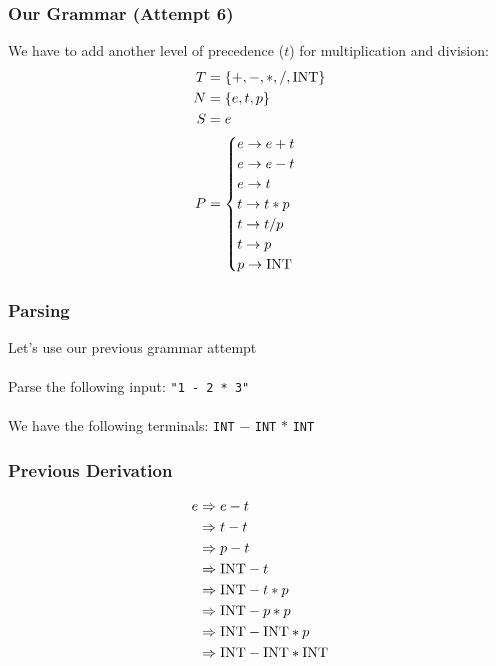 \documentclass[aspectratio=169]{beamer}
\begin{document}
\begin{frame}
\frametitle{Our Grammar (Attempt 6)}

We have to add another level of precedence ($t$) for multiplication and division:
\begin{align*}
T &= \{ +, -, *, /, \text{\lstinline{INT}} \}\\
N &= \{ e, t, p \}\\
S &= e\\
P &= \begin{cases}e \rightarrow e + t\\
     e \rightarrow e - t\\
     e \rightarrow t\\
     t \rightarrow t * p\\
     t \rightarrow t / p\\
     t \rightarrow p\\
     p \rightarrow \text{\lstinline{INT}}\end{cases}
\end{align*}
\end{frame}

\begin{frame}
\frametitle{Parsing}

Let's use our previous grammar attempt\\~\\

Parse the following input: \lstinline{"1 - 2 * 3"}\\~\\

We have the following terminals: \lstinline{INT} $-$ \lstinline{INT} $*$
\lstinline{INT}
\end{frame}

\begin{frame}
\frametitle{Previous Derivation}

\begin{align*}
e &\Rightarrow e - t\\
  &\Rightarrow t - t\\
  &\Rightarrow p - t\\
  &\Rightarrow \text{\lstinline{INT}} - t\\
  &\Rightarrow \text{\lstinline{INT}} - t * p\\
  &\Rightarrow \text{\lstinline{INT}} - p * p\\
  &\Rightarrow \text{\lstinline{INT}} - \text{\lstinline{INT}} * p\\
  &\Rightarrow \text{\lstinline{INT}} - \text{\lstinline{INT}} *
               \text{\lstinline{INT}}
\end{align*}
\end{frame}
\end{document}
